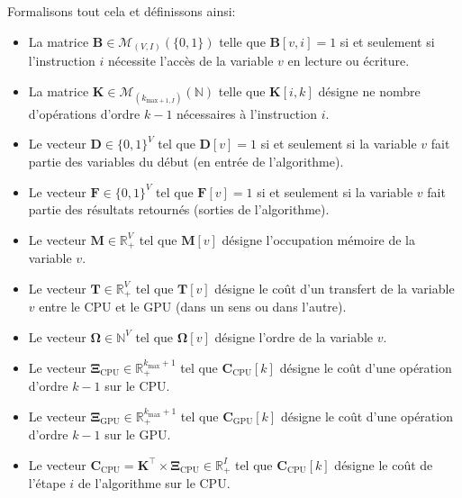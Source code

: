 \documentclass[svgnames,dvipsnames,a4paper,10pt,french]{report}
\begin{document}
\begin{appendices}
Formalisons tout cela et définissons ainsi:

\begin{itemize}
    \item La matrice $\mathbf{B}\in\mathscr{M}_{(V,I)}(\{0,1\})$ telle que $\mathbf{B}[v,i] = 1$ si et seulement si l'instruction $i$ nécessite l'accès de la variable $v$ en lecture ou écriture.
    
    \item La matrice $\mathbf{K} \in\mathscr{M}_{(k_{\text{max}+1, I})}(\mathbb{N})$ telle que $\mathbf{K}[i,k]$ désigne ne nombre d'opérations d'ordre $k-1$ nécessaires à l'instruction $i$.
    
    \item Le vecteur $\mathbf{D} \in \{0,1\}^V$ tel que $\mathbf{D}[v] = 1$ si et seulement si la variable $v$ fait partie des variables du début (en entrée de l'algorithme).
    
    \item Le vecteur $\mathbf{F} \in \{0,1\}^V$ tel que $\mathbf{F}[v] = 1$ si et seulement si la variable $v$ fait partie des résultats retournés (sorties de l'algorithme).
    
    \item Le vecteur $\mathbf{M}\in \mathbb{R}_+^V$ tel que $\mathbf{M}[v]$ désigne l'occupation mémoire de la variable $v$.
    
    \item Le vecteur $\mathbf{T} \in \mathbb{R}_+^V$ tel que $\mathbf{T}[v]$ désigne le coût d'un transfert de la variable $v$ entre le CPU et le GPU (dans un sens ou dans l'autre).
    
    \item Le vecteur $\mathbf{\Omega} \in \mathbb{N}^V$ tel que $\mathbf{\Omega}[v]$ désigne l'ordre de la variable $v$.
    
    
    \item Le vecteur $\mathbf{\Xi}_{\text{CPU}} \in \mathbb{R}_+^{k_{\text{max}}+1}$ tel que $\mathbf{C}_{\text{CPU}}[k]$ désigne le coût d'une opération d'ordre $k-1$ sur le CPU.
    
    \item Le vecteur $\mathbf{\Xi}_{\text{GPU}} \in \mathbb{R}_+^{k_{\text{max}}+1}$ tel que $\mathbf{C}_{\text{GPU}}[k]$ désigne le coût d'une opération d'ordre $k-1$ sur le GPU.
    
    \item Le vecteur $\mathbf{C}_{\text{CPU}} = \mathbf{K}^\intercal \times \mathbf{\Xi}_{\text{CPU}} \in \mathbb{R}_+^{I}$ tel que $\mathbf{C}_{\text{CPU}}[k]$ désigne le coût de l'étape $i$ de l'algorithme sur le CPU.
    

\end{itemize}
\end{appendices}
\end{document}
